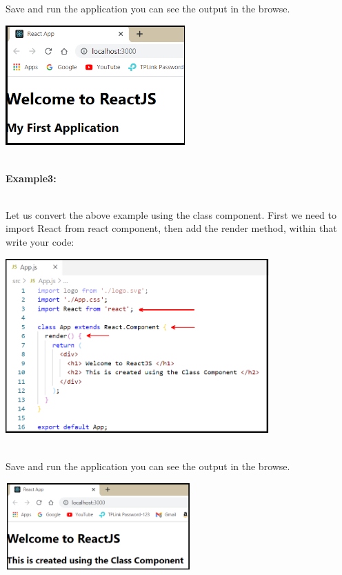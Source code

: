 \documentclass{article}
\begin{document}
\noindent 
\newpage
\noindent Save and run the application you can see the output in the browse.

\begin{center}
	\noindent \includegraphics*[width=2.71in, height=1.81in]{IMG-07-15}
\end{center}

\noindent\\
 \textbf{Example3:}

\noindent\\
 Let us convert the above example using the class component. First we need to import React from react component, then add the render method, within that write your code:

\begin{center}
	\noindent \includegraphics*[width=3.98in, height=2.64in]{IMG-07-16}
\end{center}

\noindent 

\noindent\\
 Save and run the application you can see the output in the browse.

\begin{center}
	\noindent \includegraphics*[width=2.81in, height=1.30in]{IMG-07-17}
\end{center}
\end{document}
